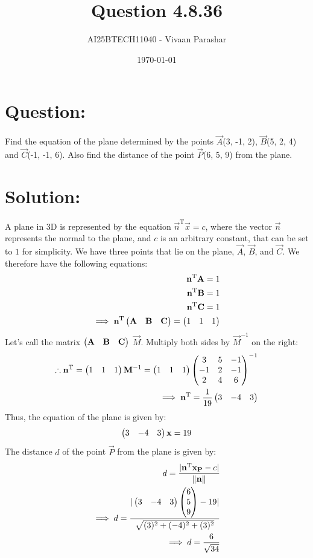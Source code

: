 \documentclass[a4paper, 12pt]{article}
\title{Question 4.8.36}
\author{AI25BTECH11040 - Vivaan Parashar}
\date{\today}
\begin{document}
\maketitle

\section{Question: }
Find the equation of the plane determined by the points $\vec{A}$(3, -1, 2), $\vec{B}$(5, 2, 4) and $\vec{C}$(-1, -1, 6). Also find the distance of the point $\vec{P}$(6, 5, 9) from the plane.

\section{Solution: }
A plane in 3D is represented by the equation $\vec{n}^\mathrm{T}\vec{x} = c$, where the vector $\vec{n}$ represents the normal to the plane, and $c$ is an arbitrary constant, that can be set to $1$ for simplicity.
We have three points that lie on the plane, $\vec{A}$, $\vec{B}$, and $\vec{C}$. We therefore have the following equations:
\begin{align}
    \mathbf{n}^\mathrm{T}\mathbf{A} = 1\\
    \mathbf{n}^\mathrm{T}\mathbf{B} = 1\\
    \mathbf{n}^\mathrm{T}\mathbf{C} = 1\\
    \implies\mathbf{n}^\mathrm{T}\begin{pmatrix}\mathbf{A} & \mathbf{B} & \mathbf{C}\end{pmatrix} = \begin{pmatrix}1 & 1 & 1\end{pmatrix}\\
\end{align}
Let's call the matrix $\begin{pmatrix}\mathbf{A} & \mathbf{B} & \mathbf{C}\end{pmatrix}$ $\vec{M}$. Multiply both sides by $\vec{M}^\mathrm{-1}$ on the right:
\begin{align}
    \therefore \mathbf{n}^\mathrm{T} = \begin{pmatrix}1 & 1 & 1\end{pmatrix}\mathbf{M}^\mathrm{-1} = \begin{pmatrix}1 & 1 & 1\end{pmatrix}\begin{pmatrix}3 & 5 & -1 \\ -1 & 2 & -1 \\ 2 & 4 & 6\end{pmatrix}^\mathrm{-1}\\
    \implies \mathbf{n}^\mathrm{T} = \frac{1}{19}\begin{pmatrix}3 & -4 & 3\end{pmatrix}
\end{align}
Thus, the equation of the plane is given by:
\begin{align}
    \begin{pmatrix}3 & -4 & 3\end{pmatrix}\mathbf{x} = 19
\end{align}
The distance $d$ of the point $\vec{P}$ from the plane is given by:
\begin{align}
    d = \frac{|\mathbf{n}^\mathrm{T}\mathbf{x_P} - c|}{\|\mathbf{n}\|}\\
    \implies d = \frac{|\begin{pmatrix}3 & -4 & 3\end{pmatrix}\begin{pmatrix}6 \\ 5 \\ 9\end{pmatrix} - 19|}{\sqrt{(3)^2 + (-4)^2 + (3)^2}}\\
    \implies d = \frac{6}{\sqrt{34}}
\end{align}
\end{document}
